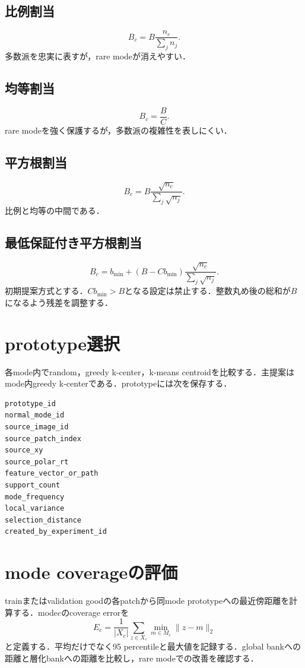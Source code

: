 \documentclass[a4paper,11pt]{ltjsarticle}
\begin{document}
\subsection{比例割当}
\begin{equation}
B_c=B\frac{n_c}{\sum_j n_j}.
\end{equation}
多数派を忠実に表すが，rare modeが消えやすい．

\subsection{均等割当}
\begin{equation}
B_c=\frac{B}{C}.
\end{equation}
rare modeを強く保護するが，多数派の複雑性を表しにくい．

\subsection{平方根割当}
\begin{equation}
B_c=B\frac{\sqrt{n_c}}{\sum_j\sqrt{n_j}}.
\end{equation}
比例と均等の中間である．

\subsection{最低保証付き平方根割当}
\begin{equation}
B_c=b_{\min}+\left(B-Cb_{\min}\right)\frac{\sqrt{n_c}}{\sum_j\sqrt{n_j}}.
\end{equation}
初期提案方式とする．$Cb_{\min}>B$となる設定は禁止する．整数丸め後の総和が$B$になるよう残差を調整する．

\section{prototype選択}
各mode内でrandom，greedy k-center，k-means centroidを比較する．主提案はmode内greedy k-centerである．prototypeには次を保存する．
\begin{lstlisting}
prototype_id
normal_mode_id
source_image_id
source_patch_index
source_xy
source_polar_rt
feature_vector_or_path
support_count
mode_frequency
local_variance
selection_distance
created_by_experiment_id
\end{lstlisting}

\section{mode coverageの評価}
trainまたはvalidation goodの各patchから同mode prototypeへの最近傍距離を計算する．mode$c$のcoverage errorを
\begin{equation}
E_c=\frac{1}{|X_c|}\sum_{z\in X_c}\min_{m\in M_c}\lVert z-m\rVert_2
\end{equation}
と定義する．平均だけでなく95 percentileと最大値を記録する．global bankへの距離と層化bankへの距離を比較し，rare modeでの改善を確認する．
\end{document}
